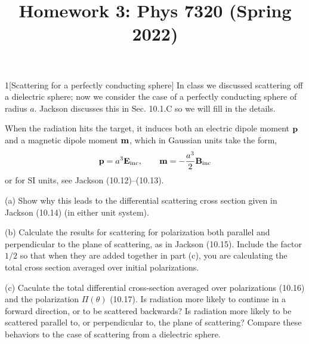 \documentclass[12pt]{article}
\title{Homework 3: Phys 7320 (Spring 2022)}
\begin{document}
\maketitle
\begin{problem}{1}[Scattering for a perfectly conducting sphere]
In class we discussed scattering off a dielectric sphere; now we consider the
case of a perfectly conducting sphere of radius $a$. Jackson discusses this in
Sec. 10.1.C so we will fill in the details.

When the radiation hits the target, it induces both an electric dipole moment
$\vb{p}$ and a magnetic dipole moment $\vb{m}$, which in Gaussian units take the
form,
\begin{equation}
    \vb{p}=a^3\vb{E}_\text{inc},\qquad
    \vb{m}=-\frac{a^3}{2}\vb{B}_\text{inc}
\end{equation}
or for SI units, see Jackson (10.12)--(10.13).

(a) Show why this leads to the differential scattering cross section given in
Jackson (10.14) (in either unit system).

(b) Calculate the results for scattering for polarization both parallel and
perpendicular to the plane of scattering, as in Jackson (10.15). Include the
factor $1/2$ so that when they are added together in part (c), you are
calculating the total cross section averaged over initial polarizations.

(c) Caculate the total differential cross-section averaged over polarizations
(10.16) and the polarization $\Pi(\theta)$ (10.17). Is radiation more likely to
continue in a forward direction, or to be scattered backwards? Is radiation more
likely to be scattered parallel to, or perpendicular to, the plane of
scattering? Compare these behaviors to the case of scattering from a
dielectric sphere.
\begin{solution}
\end{solution}
\end{problem}
\newpage
\end{document}

